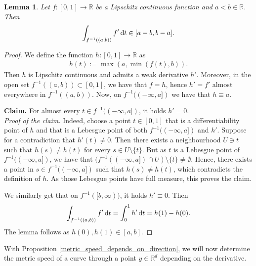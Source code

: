 \documentclass[a4paper,10pt]{article}
\newtheorem{lemma}[theorem]{Lemma}
\numberwithin{equation}{section}
\newcommand{\R}{\mathbb{R}}
\newcommand{\di}{{\rm d}}
\begin{document}
\begin{lemma}\label{derivative_truncation}
    Let $f:[0,1] \to \R$ be a Lipschitz continuous function and $a < b \in \R$. Then 
    \begin{align}
        \int_{f^{-1}((a,b))} f' \, \di t \in [a-b, b-a].
    \end{align}
\end{lemma}
\begin{proof}
    We define the function $h:[0,1] \to \R$ as 
    \begin{align*}
        h(t):= \max(a, \min(f(t), b)).
    \end{align*}
    Then $h$ is Lipschitz continuous and admits a weak derivative $h'$. Moreover, in the open set $f^{-1}((a,b)) \subset [0,1]$, we have that $f=h$, hence $h' = f'$ almost everywhere in $f^{-1}((a,b))$.
    Now, on $f^{-1}((-\infty,a])$ we have that $h \equiv a$. 
    
    \textbf{Claim.} For almost every $t \in f^{-1}((-\infty,a])$, it holds $h' =0$. \\
    \textit{Proof of the claim.} Indeed, choose a point $t \in [0,1]$ that is a differentiability point of $h$ and that is a Lebesgue point of both $f^{-1}((-\infty,a])$ and $h'$. Suppose for a contradiction that $h'(t) \neq 0$. 
    Then there exists a neighbourhood $U \ni t$ such that $h(s) \neq h(t)$ for every $s \in U \setminus \{t\}$.
    But as $t$ is a Lebesgue point of $f^{-1}((-\infty,a])$, we have that $(f^{-1}((-\infty,a]) \cap U) \setminus \{t\} \neq \emptyset$. Hence, there exists a point in $s \in f^{-1}((-\infty,a])$ such that $h(s) \neq h(t)$, which contradicts the definition of $h$. As those Lebesgue points have full measure, this proves the claim.

    We similarly get that on $f^{-1}([b, \infty))$, it holds $h' \equiv 0$. Then
    \begin{align}
      \int_{f^{-1}((a,b))} f' \, \di t = \int_0^1 h' \, \di t = h(1)-h(0).  
    \end{align}
    The lemma follows as $h(0), h(1) \in [a,b]$.
\end{proof}

With Proposition \ref{metric_speed_depends_on_direction}, we will now determine the metric speed of a curve through a point $y \in \R^d$ depending on the derivative.
\end{document}
